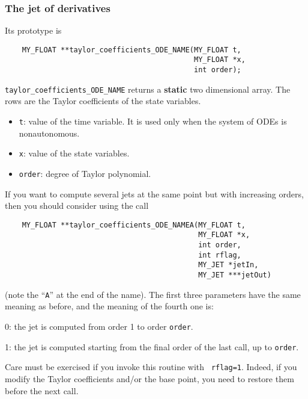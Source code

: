 \documentclass[10pt]{article}
\theoremstyle{remark}
\begin{document}
\subsubsection*{The jet of derivatives}
Its prototype is
\begin{verbatim}
    MY_FLOAT **taylor_coefficients_ODE_NAME(MY_FLOAT t,
                                            MY_FLOAT *x,
                                            int order);
\end{verbatim}
\verb+taylor_coefficients_ODE_NAME+ returns a {\bf static} two
dimensional array. The rows are the Taylor coefficients of the state
variables.

\vspace{3mm}
\begin{itemize}
  \item{\verb+t+: value of the time variable. It is used only when the
    system of ODEs is nonautonomous.}
  \item{\verb+x+: value of the state variables.}
  \item{\verb+order+: degree of Taylor polynomial.}
\end{itemize}

If you want to compute several jets at the same point but with
increasing orders, then you should consider using the call
\begin{verbatim}
    MY_FLOAT **taylor_coefficients_ODE_NAMEA(MY_FLOAT t,
                                             MY_FLOAT *x,
                                             int order,
                                             int rflag,
                                             MY_JET *jetIn, 
                                             MY_JET ***jetOut)
\end{verbatim}
(note the ``{\tt A}'' at the end of the name). The first three
parameters have the same meaning as before, and the meaning of the
fourth one is:
\begin{description}
  \item 0: the jet is computed from order 1 to order {\tt order}.
  \item 1: the jet is computed starting from the final order of the
    last call, up to {\tt order}.
\end{description}

Care must be exercised if you invoke this routine with {\tt
  rflag=1}. Indeed, if you modify the Taylor coefficients and/or the
base point, you need to restore them before the next call.
\end{document}
